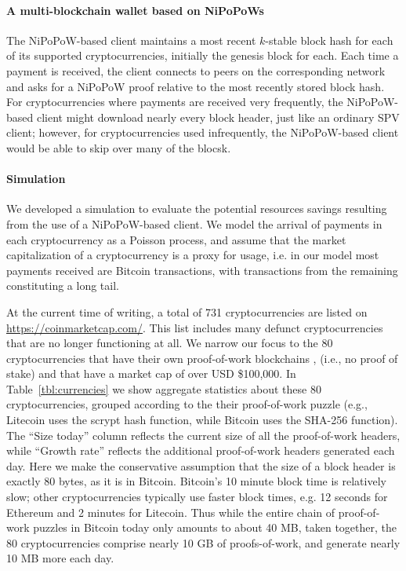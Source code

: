 \paragraph{A multi-blockchain wallet based on NiPoPoWs}
 The NiPoPoW-based client maintains a most recent $k$-stable block hash for each of its supported cryptocurrencies, initially the genesis block for each.
  Each time a payment is received, the client connects to peers on the corresponding network and asks for a NiPoPoW proof relative to the most recently stored block hash. For cryptocurrencies where payments are received very frequently, the NiPoPoW-based client might download nearly every block header, just like an ordinary SPV client; however, for cryptocurrencies used infrequently, the NiPoPoW-based client would be able to skip over many of the blocsk.

\paragraph{Simulation}
 We developed a simulation to evaluate the potential resources savings resulting from the use of a NiPoPoW-based client.
 We model the arrival of payments in each cryptocurrency as a Poisson process, and assume that the market capitalization of a cryptocurrency is a proxy for usage, i.e. in our model most payments received are Bitcoin transactions, with transactions from the remaining constituting a long tail.
 
 At the current time of writing, a total of 731 cryptocurrencies are listed on \url{https://coinmarketcap.com/}.
This list includes many defunct cryptocurrencies that are no longer functioning at all.
We narrow our focus to the 80 cryptocurrencies that have their own proof-of-work blockchains
, (i.e., no proof of stake) and that have a market cap of over USD \$100,000.
In Table~\ref{tbl:currencies} we show aggregate statistics about these 80 cryptocurrencies, grouped according to the their proof-of-work puzzle (e.g., Litecoin uses the scrypt hash function, while Bitcoin uses the SHA-256 function). The ``Size today'' column reflects the current size of all the proof-of-work headers, while ``Growth rate'' reflects the additional proof-of-work headers generated each day. Here we make the conservative assumption that the size of a block header is exactly 80 bytes, as it is in Bitcoin.
Bitcoin's 10 minute block time is relatively slow; other cryptocurrencies typically use faster block times, e.g. 12 seconds for Ethereum and 2 minutes for Litecoin. Thus while the entire chain of proof-of-work puzzles in Bitcoin today only amounts to about 40 MB, taken together, the 80 cryptocurrencies comprise nearly 10 GB of proofs-of-work, and generate nearly 10 MB more each day.

